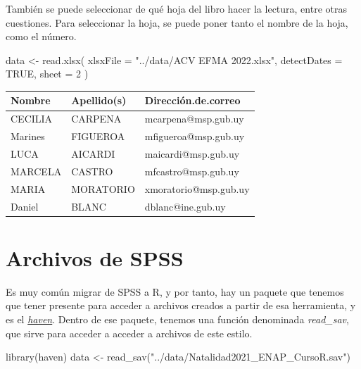 \documentclass[
  letterpaper,
  DIV=11,
  numbers=noendperiod]{scrreprt}
\newenvironment{Shaded}{\begin{snugshade}}{\end{snugshade}}
\newcommand{\AttributeTok}[1]{\textcolor[rgb]{0.40,0.45,0.13}{#1}}
\newcommand{\ConstantTok}[1]{\textcolor[rgb]{0.56,0.35,0.01}{#1}}
\newcommand{\DecValTok}[1]{\textcolor[rgb]{0.68,0.00,0.00}{#1}}
\newcommand{\FunctionTok}[1]{\textcolor[rgb]{0.28,0.35,0.67}{#1}}
\newcommand{\NormalTok}[1]{\textcolor[rgb]{0.00,0.23,0.31}{#1}}
\newcommand{\OtherTok}[1]{\textcolor[rgb]{0.00,0.23,0.31}{#1}}
\newcommand{\StringTok}[1]{\textcolor[rgb]{0.13,0.47,0.30}{#1}}
\begin{document}
También se puede seleccionar de qué hoja del libro hacer la lectura,
entre otras cuestiones. Para seleccionar la hoja, se puede poner tanto
el nombre de la hoja, como el número.

\begin{Shaded}
\begin{Highlighting}[]
\NormalTok{data }\OtherTok{\textless{}{-}} \FunctionTok{read.xlsx}\NormalTok{(}
  \AttributeTok{xlsxFile =} \StringTok{"../data/ACV EFMA 2022.xlsx"}\NormalTok{,}
  \AttributeTok{detectDates =} \ConstantTok{TRUE}\NormalTok{,}
  \AttributeTok{sheet =} \DecValTok{2}
\NormalTok{)}
\end{Highlighting}
\end{Shaded}

\begin{longtable}[]{@{}lll@{}}
\toprule()
Nombre & Apellido(s) & Dirección.de.correo \\
\midrule()
\endhead
CECILIA & CARPENA & mcarpena@msp.gub.uy \\
Marines & FIGUEROA & mfigueroa@msp.gub.uy \\
LUCA & AICARDI & maicardi@msp.gub.uy \\
MARCELA & CASTRO & mfcastro@msp.gub.uy \\
MARIA & MORATORIO & xmoratorio@msp.gub.uy \\
Daniel & BLANC & dblanc@ine.gub.uy \\
\bottomrule()
\end{longtable}

\hypertarget{archivos-de-spss}{%
\section{Archivos de SPSS}\label{archivos-de-spss}}

Es muy común migrar de SPSS a R, y por tanto, hay un paquete que tenemos
que tener presente para acceder a archivos creados a partir de esa
herramienta, y es el
\href{https://www.rdocumentation.org/packages/haven/versions/2.5.0}{\emph{haven}}.
Dentro de ese paquete, tenemos una función denominada \emph{read\_sav},
que sirve para acceder a acceder a archivos de este estilo.

\begin{Shaded}
\begin{Highlighting}[]
\FunctionTok{library}\NormalTok{(haven)}
\NormalTok{data }\OtherTok{\textless{}{-}} \FunctionTok{read\_sav}\NormalTok{(}\StringTok{"../data/Natalidad2021\_ENAP\_CursoR.sav"}\NormalTok{)}
\end{Highlighting}
\end{Shaded}
\end{document}
